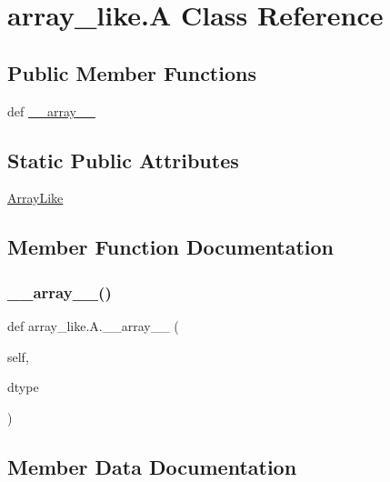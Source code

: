 \hypertarget{classarray__like_1_1A}{}\section{array\+\_\+like.\+A Class Reference}
\label{classarray__like_1_1A}
\subsection*{Public Member Functions}
\begin{DoxyCompactItemize}
\item 
def \hyperlink{classarray__like_1_1A_acf37a86acdeea83d87529fe059beb39b}{\+\_\+\+\_\+array\+\_\+\+\_\+}
\end{DoxyCompactItemize}
\subsection*{Static Public Attributes}
\begin{DoxyCompactItemize}
\item 
\hyperlink{classarray__like_1_1A_a29091df6d3cc3837a9c4cc4f33f71c0d}{Array\+Like}
\end{DoxyCompactItemize}


\subsection{Member Function Documentation}
\mbox{\label{classarray__like_1_1A_acf37a86acdeea83d87529fe059beb39b}} 
\subsubsection{\texorpdfstring{\+\_\+\+\_\+array\+\_\+\+\_\+()}{\_\_array\_\_()}}
{\footnotesize\ttfamily def array\+\_\+like.\+A.\+\_\+\+\_\+array\+\_\+\+\_\+ (\begin{DoxyParamCaption}\item[{}]{self,  }\item[{}]{dtype }\end{DoxyParamCaption})}



\subsection{Member Data Documentation}
\mbox{\label{classarray__like_1_1A_a29091df6d3cc3837a9c4cc4f33f71c0d}} 
